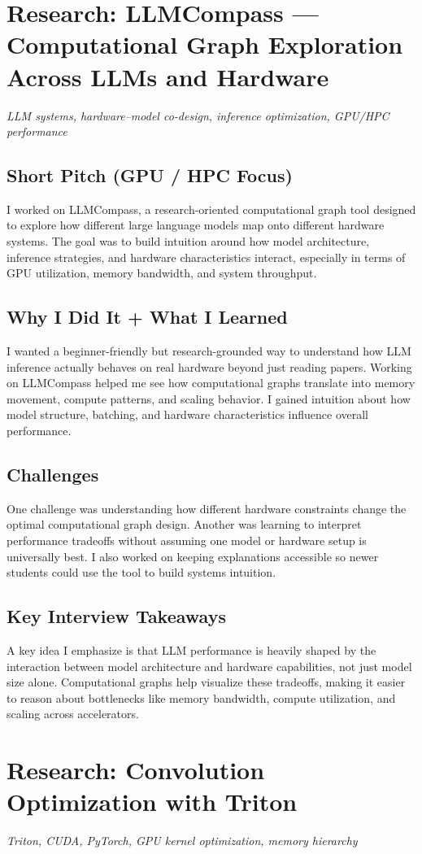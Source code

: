 \documentclass[11pt]{article}
\newcommand{\ProjectHeader}[2]{%
\section*{\textcolor{projectcolor}{#1}}%
\noindent\textit{#2}\par\vspace{0.4em}
}
\begin{document}
\ProjectHeader{Research: LLMCompass — Computational Graph Exploration Across LLMs and Hardware}{LLM systems, hardware–model co-design, inference optimization, GPU/HPC performance}

\subsection{Short Pitch (GPU / HPC Focus)}
I worked on LLMCompass, a research-oriented computational graph tool designed to explore how different large language models map onto different hardware systems. The goal was to build intuition around how model architecture, inference strategies, and hardware characteristics interact, especially in terms of GPU utilization, memory bandwidth, and system throughput.

\subsection{Why I Did It + What I Learned}
I wanted a beginner-friendly but research-grounded way to understand how LLM inference actually behaves on real hardware beyond just reading papers. Working on LLMCompass helped me see how computational graphs translate into memory movement, compute patterns, and scaling behavior. I gained intuition about how model structure, batching, and hardware characteristics influence overall performance.

\subsection{Challenges}
One challenge was understanding how different hardware constraints change the optimal computational graph design. Another was learning to interpret performance tradeoffs without assuming one model or hardware setup is universally best. I also worked on keeping explanations accessible so newer students could use the tool to build systems intuition.

\subsection{Key Interview Takeaways}
A key idea I emphasize is that LLM performance is heavily shaped by the interaction between model architecture and hardware capabilities, not just model size alone. Computational graphs help visualize these tradeoffs, making it easier to reason about bottlenecks like memory bandwidth, compute utilization, and scaling across accelerators.
\ProjectHeader{Research: Convolution Optimization with Triton}{Triton, CUDA, PyTorch, GPU kernel optimization, memory hierarchy}
\end{document}

